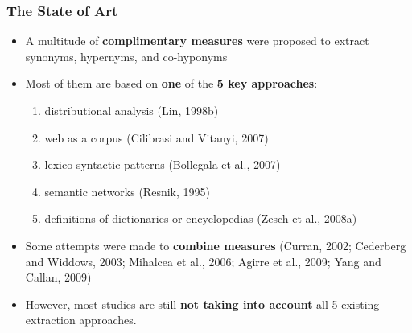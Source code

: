 \documentclass{beamer}
\begin{document}
\begin{frame}
\frametitle{The State of Art}
\begin{itemize}
\item A multitude of \textbf{complimentary measures} were proposed to extract synonyms, hypernyms,
and co-hyponyms

\item Most of them are based on \textbf{one} of the \textbf{5 key approaches}: 
\begin{enumerate}
\item distributional analysis (Lin, 1998b)
\item web as a corpus (Cilibrasi and Vitanyi, 2007)
\item lexico-syntactic patterns (Bollegala et al., 2007)
\item semantic networks (Resnik, 1995)
\item definitions of dictionaries or encyclopedias (Zesch et al., 2008a)
\end{enumerate}


\item Some attempts were made to \textbf{combine measures} (Curran, 2002; Cederberg and Widdows, 2003; Mihalcea et al., 2006;
Agirre et al., 2009; Yang and Callan, 2009)


\item However, most studies are still \textbf{not taking into account}
all 5 existing extraction approaches.

\end{itemize}

\end{frame}



\end{document}
